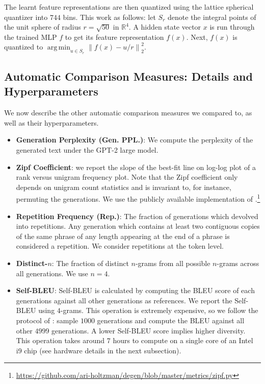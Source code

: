 \documentclass{article}
\theoremstyle{definition}
\newcommand \argmin {\operatorname*{arg\,min}} %
\newcommand \reals {\mathbb{R}}
\newcommand{\name}{{\fontfamily{bch}\selectfont{\textsc{Mauve}}}\xspace}
\begin{document}
The learnt feature representations 
are then
quantized using the lattice spherical
quantizer into $744$ bins.
This work as follows:
let $S_r$ denote the integral points 
of the unit sphere of radius $r=\sqrt{50}$ in
$\reals^4$.
A hidden state vector $x$ is run through
the trained MLP $f$ to get its feature
representation $f(x)$. 
Next, $f(x)$ is quantized to
$
\argmin_{u \in S_r} \left\| f(x) - {u}/{r}\right\|_2^2 
$.
%
%
%

\subsection{Automatic Comparison Measures: Details and Hyperparameters} \label{sec:supp:automatic-details}
We now describe the other automatic comparison measures we compared \name to, as well as their hyperparameters.
\begin{itemize}[itemsep=0cm,leftmargin=0.5cm]
    \item \textbf{Generation Perplexity (Gen. PPL.)}: We compute the perplexity of the generated text under the GPT-2 large model. 
    \item \textbf{Zipf Coefficient}: we report the slope of the best-fit line 
        on log-log plot of a rank versus unigram frequency plot. Note that the Zipf coefficient only depends on unigram count statistics and is invariant to, for instance, permuting the generations. We use the publicly available implementation of \cite{holtzman2019curious}.\footnote{ \url{https://github.com/ari-holtzman/degen/blob/master/metrics/zipf.py}}
    \item \textbf{Repetition Frequency (Rep.)}: The fraction of generations which devolved into repetitions. Any generation which contains at least two contiguous copies of the same phrase of any length appearing at the 
    end of a phrase is considered a repetition. We consider repetitions at the token level. 
    \item \textbf{Distinct-$n$}: The fraction of distinct $n$-grams from all possible $n$-grams across all generations. We use $n = 4$.
    \item \textbf{Self-BLEU}: Self-BLEU  is  calculated  by  computing  the  BLEU  score  of  each  generations against all other generations as references. We report the Self-BLEU using $4$-grams. 
    This operation is extremely expensive, so we follow the protocol of \cite{holtzman2019curious}: sample $1000$ generations and compute the BLEU against all other $4999$ generations. A lower Self-BLEU score implies higher diversity. This operation takes around $7$ hours to compute on a single core of an Intel i9 chip (see hardware details in the next subsection). 

\end{itemize}
\end{document}
